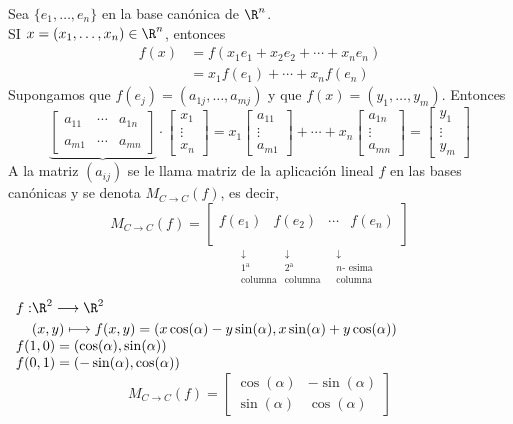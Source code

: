 Sea $\{e_1,\dots,e_n\}$ en la base canónica de $\R^n$.\\
SI $x=(x_1,\dots,x_n)\in\R^n$, entonces \begin{align*}
	f(x)&=f(x_1e_1+x_2e_2+\cdots+x_ne_n)\\
	&=x_1f(e_1)+\cdots+x_nf(e_n)
\end{align*}
Supongamos que $f(e_j)=(a_{1j},\dots,a_{mj})$ y que $f(x)=(y_1,\dots,y_m)$. Entonces \[ \underbrace{\begin{bmatrix}
		a_{11} & \cdots & a_{1n}\\
		& & \\
		a_{m1} & \cdots & a_{mn}
\end{bmatrix}}\cdot\begin{bmatrix}
	x_{1}\\
	\vdots\\
	x_n
\end{bmatrix}=x_1\begin{bmatrix}
	a_{11}\\
	\vdots\\
	a_{m1}
\end{bmatrix}+\cdots+x_n\begin{bmatrix}
	a_{1n}\\
	\vdots\\
	a_{mn}
\end{bmatrix}=\begin{bmatrix}
	y_1\\
	\vdots\\
	y_m
\end{bmatrix} \]
A la matriz $(a_{ij})$ se le llama matriz de la aplicación lineal $f$ en las bases canónicas y se denota $M_{C\to C}(f)$, es decir, \[ M_{C\to C}(f)=\underset{\begin{array}{cccc}
		\downarrow & \downarrow & & \downarrow\\
		\text{1}^\text{a} & \text{2}^\text{a} & & \text{$n$-
			esima}\\
		\text{columna} & \text{columna} & & \text{columna}
\end{array}}{\left[\begin{array}{cccc}
		& & & \\
		f(e_1) & f(e_2) & \cdots & f(e_n)\\
		& & & \\
	\end{array}\right]} \]
\Ej

$\begin{array}{l}
	\begin{aligned}
		f:&\R^2\longrightarrow\R^2\\
		&(x,y)\longmapsto f(x,y)=(x\cos(\alpha)-y\sin(\alpha), x\sin(\alpha)+y\cos(\alpha))
	\end{aligned}\\
	f(1,0)=(\cos(\alpha),\sin(\alpha))\\
	f(0,1)=(-\sin(\alpha),\cos(\alpha))
\end{array}$\[ M_{C\to C}(f)=\begin{bmatrix}
	\cos(\alpha) & -\sin(\alpha)\\
	\sin(\alpha) & \cos(\alpha)
\end{bmatrix} \]

